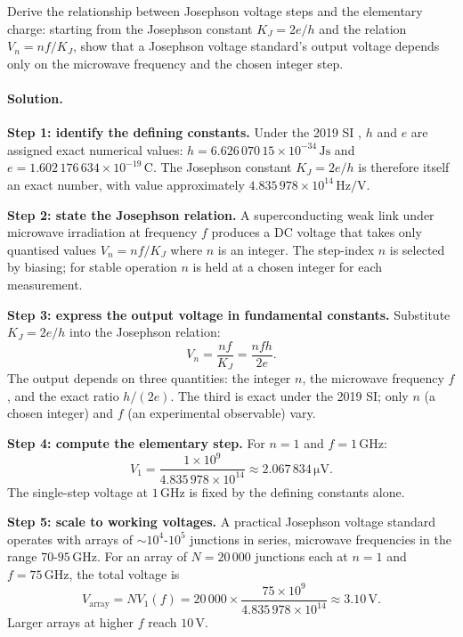 \begin{exercise}
Derive the relationship between Josephson voltage steps and the
elementary charge: starting from the Josephson constant $K_J = 2e/h$
and the relation $V_n = nf/K_J$, show that a Josephson voltage
standard's output voltage depends only on the microwave frequency
and the chosen integer step.

\paragraph{Solution.}
\textbf{Step 1: identify the defining constants.} Under the 2019
SI \cite{std:bipm-si2019}, $h$ and $e$ are assigned exact numerical
values: $h = 6.626\,070\,15 \times 10^{-34} \,\si{\joule\second}$
and $e = 1.602\,176\,634 \times 10^{-19} \,\si{\coulomb}$. The
Josephson constant $K_{J} = 2e/h$ is therefore itself an exact
number, with value approximately $4.835\,978 \times 10^{14} \,\si
{\hertz\per\volt}$.

\textbf{Step 2: state the Josephson relation.} A superconducting
weak link under microwave irradiation at frequency $f$ produces a
DC voltage that takes only quantised values $V_{n} = nf/K_{J}$
where $n$ is an integer. The step-index $n$ is selected by
biasing; for stable operation $n$ is held at a chosen integer for
each measurement.

\textbf{Step 3: express the output voltage in fundamental
constants.} Substitute $K_{J} = 2e/h$ into the Josephson relation:
\[
V_{n} = \frac{nf}{K_{J}} = \frac{nfh}{2e}.
\]
The output depends on three quantities: the integer $n$, the
microwave frequency $f$, and the exact ratio $h/(2e)$. The third is
exact under the 2019 SI; only $n$ (a chosen integer) and $f$
(an experimental observable) vary.

\textbf{Step 4: compute the elementary step.} For $n = 1$ and
$f = 1 \,\text{GHz}$:
\[
V_{1} = \frac{1 \times 10^{9}}{4.835\,978 \times 10^{14}}
\approx 2.067\,834 \,\si{\micro\volt}.
\]
The single-step voltage at $1 \,\text{GHz}$ is fixed by the
defining constants alone.

\textbf{Step 5: scale to working voltages.} A practical Josephson
voltage standard operates with arrays of $\sim 10^{4}$-$10^{5}$
junctions in series, microwave frequencies in the range
$70$-$95 \,\text{GHz}$. For an array of $N = 20\,000$ junctions
each at $n = 1$ and $f = 75 \,\text{GHz}$, the total voltage is
\[
V_{\text{array}} = N V_{1}(f) = 20\,000 \times
\frac{75 \times 10^{9}}{4.835\,978 \times 10^{14}}
\approx 3.10 \,\si{\volt}.
\]
Larger arrays at higher $f$ reach $10 \,\si{\volt}$.


\end{exercise}
